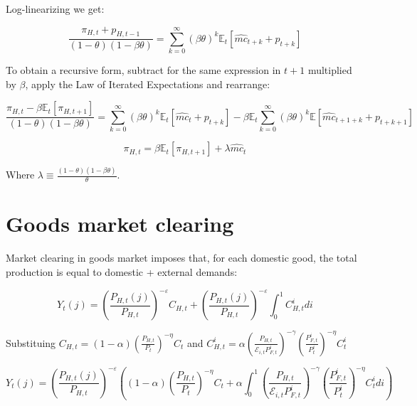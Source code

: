 \documentclass{article}
\newcommand{\Et}{\mathbb{E}_t}
\begin{document}
Log-linearizing we get:

\begin{equation}
    \frac{\pi_{H,t} + p_{H,t-1}}{(1-\theta)(1-\beta \theta) } = \sum^\infty_{k=0} (\beta \theta)^k \Et[\hat{mc}_{t+k} + p_{t+k}] 
\end{equation}

To obtain a recursive form, subtract for the same expression in $t+1$ multiplied by $\beta$, apply the Law of Iterated Expectations and rearrange:

\begin{equation}
    \frac{\pi_{H,t} - \beta \Et[\pi_{H,t+1}]}{(1-\theta)(1-\beta \theta) } = \sum^\infty_{k=0} (\beta \theta)^k \Et[\hat{mc}_t + p_{t+k}]  - \beta \Et \sum^\infty_{k=0} (\beta \theta)^k  \mathbb E[\hat{mc}_{t+1+k} + p_{t+k+1}] 
\end{equation}


\begin{equation}
    \pi_{H,t} = \beta \Et[\pi_{H,t+1}] + \lambda \hat{mc}_t
\end{equation}

Where $\lambda \equiv \frac{(1-\theta) (1 - \beta \theta)}{\theta}$.

\section{Goods market clearing}
Market clearing in goods market imposes that, for each domestic good, the total production is equal to domestic + external demands:

\begin{equation}
    Y_{t}(j) = \left( \frac{P_{H,t}(j)}{P_{H,t}} \right)^{-\varepsilon} C_{H,t} + \left( \frac{P_{H,t}(j)}{P_{H,t}} \right)^{-\varepsilon} \int_0^1 C^i_{H, t} di
\end{equation}

Substituing $C_{H,t} = (1-\alpha) \left( \frac{P_{H,t}}{P_t} \right)^{-\eta} C_t$ and $C^i_{H,t} = \alpha \left( \frac{P_{H,t}}{\mathcal{E}_{i,t} P^i_{F,t}} \right)^{-\gamma} \left( \frac{P^i_{F,t}}{P^i_{t}} \right)^{-\eta} C^i_t$

\begin{equation}
    Y_{t}(j) = \left( \frac{P_{H,t}(j)}{P_{H,t}} \right)^{-\varepsilon} \left((1-\alpha) \left( \frac{P_{H,t}}{P_t} \right)^{-\eta} C_t +  \alpha \int_0^1 \left( \frac{P_{H,t}}{\mathcal{E}_{i,t} P^i_{F,t}} \right)^{-\gamma} \left( \frac{P^i_{F,t}}{P^i_{t}} \right)^{-\eta} C^i_t di \right)
\end{equation}
\end{document}
